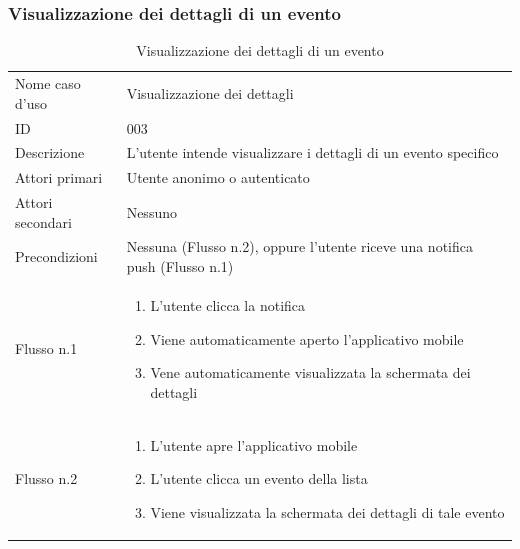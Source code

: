 \documentclass{article}
\begin{document}
\subsubsection{Visualizzazione dei dettagli di un evento}

\begin{table}[htbp]
    \label{8.2.2}
    \centering
    \begin{tabularx}{\textwidth}{| l | X |}
        \Xhline{2pt} %
        Nome caso d'uso & Visualizzazione dei dettagli \\
        \Xhline{2pt} %
        ID & 003 \\
        \hline
        Descrizione & L'utente intende visualizzare i dettagli di un evento specifico\\
        \hline
        Attori primari & Utente anonimo o autenticato\\
        \hline
        Attori secondari & Nessuno \\
        \hline
        Precondizioni & Nessuna (Flusso n.2), oppure l'utente riceve una notifica push (Flusso n.1)\\
        \hline
        Flusso n.1 & 
        \begin{enumerate}[topsep=5pt,partopsep=0pt,parsep=0pt,itemsep=0pt,before=\vspace{-\baselineskip},after=\vspace{-\baselineskip}] 
            \item L'utente clicca la notifica
            \item Viene automaticamente aperto l'applicativo mobile
            \item Vene automaticamente visualizzata la schermata dei dettagli
        \end{enumerate}
        \\
        \hline
        Flusso n.2 & 
        \begin{enumerate}[topsep=5pt,partopsep=0pt,parsep=0pt,itemsep=0pt,before=\vspace{-\baselineskip},after=\vspace{-\baselineskip}]                
            \item L'utente apre l'applicativo mobile
            \item L'utente clicca un evento della lista
            \item Viene visualizzata la schermata dei dettagli di tale evento
        \end{enumerate}
        \\
        \hline
    \end{tabularx}
    \caption{Visualizzazione dei dettagli di un evento}
\end{table}
\end{document}
